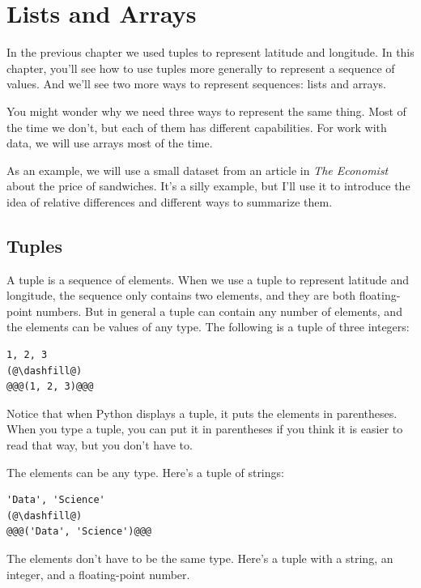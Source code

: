 \hypertarget{lists-and-arrays}{%
\chapter{Lists and Arrays}\label{lists-and-arrays}}

In the previous chapter we used tuples to represent latitude and
longitude. In this chapter, you'll see how to use tuples more generally
to represent a sequence of values. And we'll see two more ways to
represent sequences: lists and arrays.

You might wonder why we need three ways to represent the same thing.
Most of the time we don't, but each of them has different capabilities.
For work with data, we will use arrays most of the time.

As an example, we will use a small dataset from an article in \emph{The
Economist} about the price of sandwiches. It's a silly example, but I'll
use it to introduce the idea of relative differences and different ways
to summarize them.

\hypertarget{tuples}{%
\section{Tuples}\label{tuples}}

A tuple is a sequence of elements. When we use a tuple to represent
latitude and longitude, the sequence only contains two elements, and
they are both floating-point numbers. But in general a tuple can contain
any number of elements, and the elements can be values of any type. The
following is a tuple of three integers:

\begin{lstlisting}[]
1, 2, 3
(@\dashfill@)
@@@(1, 2, 3)@@@
\end{lstlisting}

Notice that when Python displays a tuple, it puts the elements in
parentheses. When you type a tuple, you can put it in parentheses if you
think it is easier to read that way, but you don't have to.

The elements can be any type. Here's a tuple of strings:

\begin{lstlisting}[]
'Data', 'Science'
(@\dashfill@)
@@@('Data', 'Science')@@@
\end{lstlisting}

The elements don't have to be the same type. Here's a tuple with a
string, an integer, and a floating-point number.

